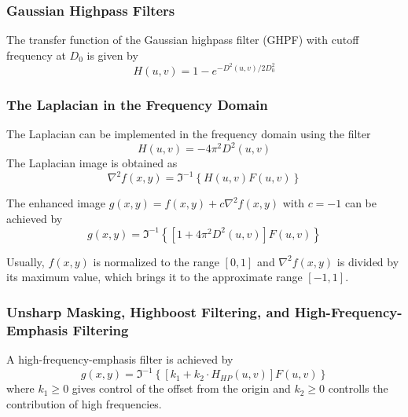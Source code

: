 \subsubsection{Gaussian Highpass Filters}
The transfer function of the Gaussian highpass filter (GHPF) with cutoff frequency at $D_0$ is given by
\begin{equation}
	H(u,v) = 1 - e^{-D^2(u,v)/2D_0^2}
\end{equation}

\subsubsection{The Laplacian in the Frequency Domain }
The Laplacian can be implemented in the frequency domain using the filter
\begin{equation}
	H(u,v) = -4 \pi^2 D^2(u,v)
	\label{equ:Laplacian_Freq_Domain}
\end{equation}
The Laplacian image is obtained as
\begin{equation}
	\nabla^2 f(x,y) = \Im^{-1} \left\lbrace H(u,v)F(u,v) \right\rbrace 
\end{equation}

The enhanced image $g(x,y) = f(x,y) + c \nabla^2f(x,y)$ with $c=-1$ can be achieved by
\begin{equation}
	g(x,y) = \Im^{-1} \left\lbrace \left[ 1 + 4 \pi^2 D^2(u,v) \right] F(u,v) \right\rbrace 
\end{equation}

Usually, $f(x,y)$ is normalized to the range $\left[0,1\right]$ and $\nabla^2 f(x,y)$ is divided by its maximum value, which brings it to the approximate range $\left[-1,1\right]$.

\subsubsection{Unsharp Masking, Highboost Filtering, and High-Frequency-Emphasis Filtering }
A high-frequency-emphasis filter is achieved by
\begin{equation}
	g(x,y) = \Im^{-1} \left\lbrace \left[ k_1 + k_2 \cdot H_{HP}(u,v) \right] F(u,v) \right\rbrace 
\end{equation}
where $k_1 \geq 0$ gives control of the offset from the origin and $k_2 \geq 0$ controlls the contribution of high frequencies.

